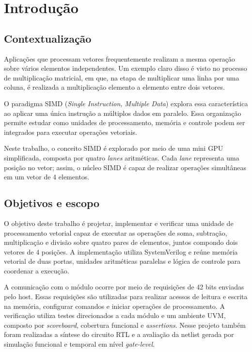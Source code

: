 \documentclass[10pt,a4paper]{article}
\begin{document}
\section{Introdução}

\subsection{Contextualização}
Aplicações que processam vetores frequentemente realizam a mesma operação sobre vários elementos independentes. Um exemplo claro disso é visto no processo de multiplicação matricial, em que, na etapa de multiplicar uma linha por uma coluna, é realizada a multiplicação elemento a elemento entre dois vetores.

O paradigma SIMD (\textit{Single Instruction, Multiple Data}) explora essa característica ao aplicar uma única instrução a múltiplos dados em paralelo. Essa organização permite estudar como unidades de processamento, memória e controle podem ser integrados para executar operações vetoriais.

Neste trabalho, o conceito SIMD é explorado por meio de uma mini GPU simplificada, composta por quatro \textit{lanes} aritméticas. Cada \textit{lane} representa uma posição no vetor; assim, o núcleo SIMD é capaz de realizar operações simultâneas em um vetor de 4 elementos.

\subsection{Objetivos e escopo}
O objetivo deste trabalho é projetar, implementar e verificar uma unidade de processamento vetorial capaz de executar as operações de soma, subtração, multiplicação e divisão sobre quatro pares de elementos, juntos compondo dois vetores de 4 posições. A implementação utiliza SystemVerilog e reúne memória vetorial de duas portas, unidades aritméticas paralelas e lógica de controle para coordenar a execução.

A comunicação com o módulo ocorre por meio de requisições de 42 bits enviadas pelo host. Essas requisições são utilizadas para realizar acessos de leitura e escrita na memória, configurar comandos e iniciar operações de processamento. A verificação utiliza testes direcionados a cada módulo e um ambiente UVM, composto por \textit{scoreboard}, cobertura funcional e \textit{assertions}. Nesse projeto também foram realizadas a síntese do circuito RTL e a avaliação da netlist gerada por simulação funcional e temporal em nível \textit{gate-level}.
\end{document}
